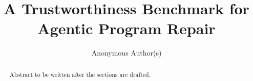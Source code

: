 \documentclass[acmsmall,screen,review,anonymous]{acmart}
\begin{document}
\title{A Trustworthiness Benchmark for Agentic Program Repair}

\author{Anonymous Author(s)}

\begin{abstract}
Abstract to be written after the sections are drafted.
\end{abstract}


\maketitle












\clearpage


\end{document}
